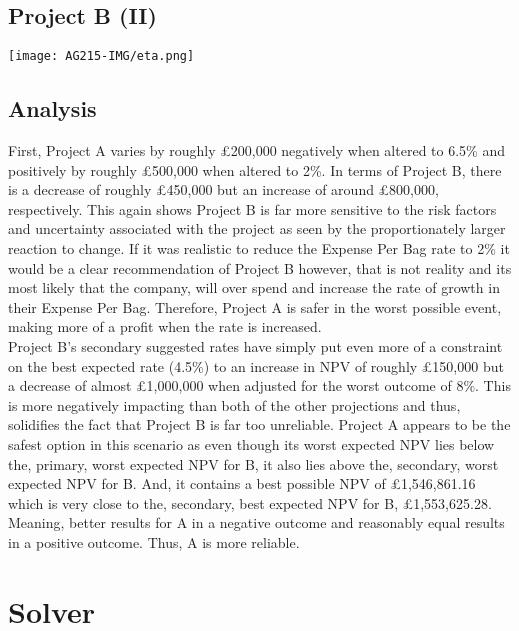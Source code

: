 \documentclass[11pt, english]{article}
\begin{document}
	\subsection{Project B (II)}

        \begin{center}
                \texttt{[image: AG215-IMG/eta.png]} 
        \end{center}

	\subsection{Analysis}

	First, Project A varies by roughly \pounds200,000 negatively when altered to 6.5\% and positively by roughly £500,000 when altered to 2\%. In terms of Project B, there is a decrease of roughly \pounds450,000 but an increase of around \pounds800,000, respectively. This again shows Project B is far more sensitive to the risk factors and uncertainty associated with the project as seen by the proportionately larger reaction to change. If it was realistic to reduce the Expense Per Bag rate to 2\% it would be a clear recommendation of Project B however, that is not reality and its most likely that the company, will over spend and increase the rate of growth in their Expense Per Bag. Therefore, Project A is safer in the worst possible event, making more of a profit when the rate is increased.\\

	Project B's secondary suggested rates have simply put even more of a constraint on the best expected rate (4.5\%) to an increase in NPV of roughly \pounds150,000 but a decrease of almost \pounds1,000,000 when adjusted for the worst outcome of 8\%. This is more negatively impacting than both of the other projections and thus, solidifies the fact that Project B is far too unreliable. Project A appears to be the safest option in this scenario as even though its worst expected NPV lies below the, primary, worst expected NPV for B, it also lies above the, secondary, worst expected NPV for B. And, it contains a best possible NPV of \pounds1,546,861.16 which is very close to the, secondary, best expected NPV for B, \pounds1,553,625.28. Meaning, better results for A in a negative outcome and reasonably equal results in a positive outcome. Thus, A is more reliable.

\newpage

\section{Solver}
\end{document}
